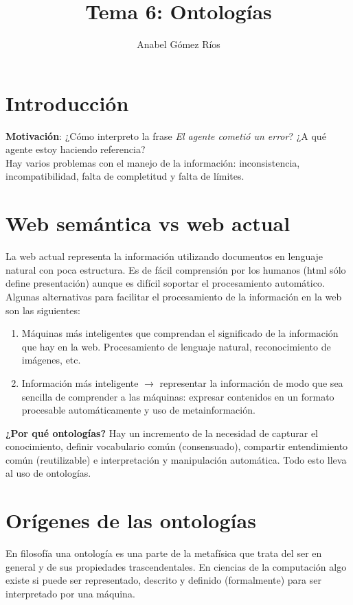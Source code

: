 \documentclass[12pt]{article}
\title{Tema 6: Ontologías}
\author{Anabel G\'omez R\'ios}
\begin{document}
\maketitle

\section{Introducción}
\textbf{Motivación}: ¿Cómo interpreto la frase \textit{El agente cometió un error}? ¿A qué agente estoy haciendo referencia?\\

Hay varios problemas con el manejo de la información: inconsistencia, incompatibilidad, falta de completitud y falta de límites.

\section{Web semántica vs web actual}
La web actual representa la información utilizando documentos en lenguaje natural con poca estructura. Es de fácil comprensión por los humanos (html sólo define presentación) aunque es difícil soportar el procesamiento automático.\\
Algunas alternativas para facilitar el procesamiento de la información en la web son las siguientes:
\begin{enumerate}
\item Máquinas más inteligentes que comprendan el significado de la información que hay en la web. Procesamiento de lenguaje natural, reconocimiento de imágenes, etc.
\item Información más inteligente $\rightarrow$ representar la información de modo que sea sencilla de comprender a las máquinas: expresar contenidos en un formato procesable automáticamente y uso de metainformación.
\end{enumerate}

\textbf{¿Por qué ontologías?} Hay un incremento de la necesidad de capturar el conocimiento, definir vocabulario común (consensuado), compartir entendimiento común (reutilizable) e interpretación y manipulación automática. Todo esto lleva al uso de ontologías.

\section{Orígenes de las ontologías}
En filosofía una ontología es una parte de la metafísica que trata del ser en general y de sus propiedades trascendentales. En ciencias de la computación algo existe si puede ser representado, descrito y definido (formalmente) para ser interpretado por una máquina.\\
\end{document}

